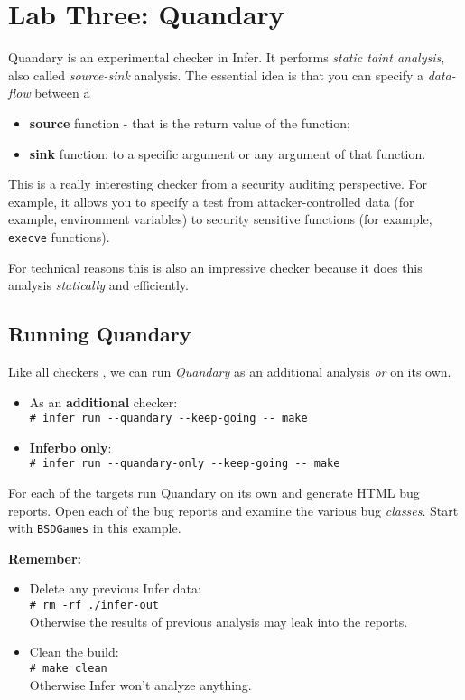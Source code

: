 \section{Lab Three: Quandary}

Quandary is an experimental checker in Infer. 
It performs \textit{static taint analysis}, also called \textit{source-sink} analysis.
The essential idea is that you can specify a \textit{data-flow} between a
\begin{itemize}
	\item \textbf{source} function - that is the return value of the function;
	\item \textbf{sink} function: to a specific argument or any argument of that function.
\end{itemize} 

This is a really interesting checker from a security auditing perspective. 
For example, it allows you to specify a test from attacker-controlled data 
(for example, environment variables) to security sensitive functions (for example, \texttt{execve} functions).

For technical reasons this is also an impressive checker because it does this 
analysis \textit{statically} and efficiently.

\subsection{Running Quandary}

Like all checkers , we can run \textit{Quandary} as an additional analysis \textit{or} on its own.

\begin{itemize}
	\item As an \textbf{additional} checker: \\
	\verb|# infer run --quandary --keep-going -- make |
	\item \textbf{Inferbo only}:\\
	\verb|# infer run --quandary-only --keep-going -- make |	
\end{itemize}


\vspace{0.5cm}
For each of the targets run Quandary on its own and generate HTML bug reports.
Open each of the bug reports and examine the various bug \textit{classes}.
Start with \texttt{BSDGames} in this example.

\textbf{Remember: }
\begin{itemize}
	\item Delete any previous Infer data:\\
	\verb|# rm -rf ./infer-out| \\
	Otherwise the results of previous analysis may leak into the reports.
	\item Clean the build:\\
	\verb|# make clean|\\
	Otherwise Infer won't analyze anything.
\end{itemize}

